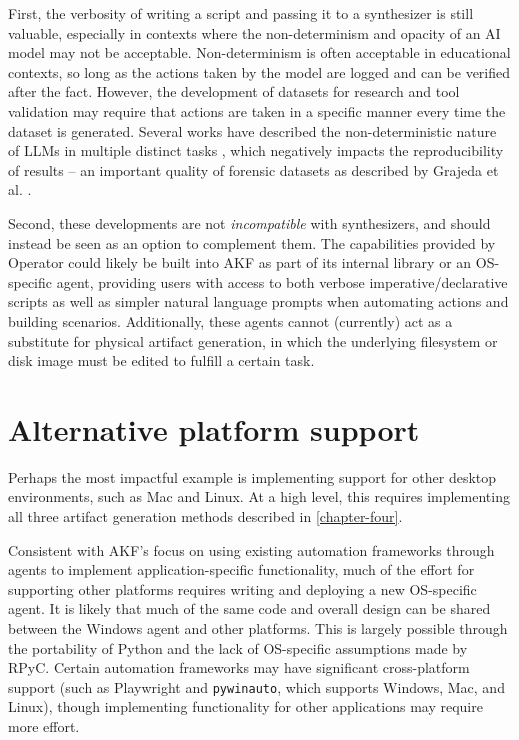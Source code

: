 \documentclass[letterpaper,12pt]{report}
\newcommand{\passthrough}[1]{#1}
\begin{document}
First, the verbosity of writing a script and passing it to a synthesizer
is still valuable, especially in contexts where the non-determinism and
opacity of an AI model may not be acceptable. Non-determinism is often
acceptable in educational contexts, so long as the actions taken by the
model are logged and can be verified after the fact. However, the
development of datasets for research and tool validation may require
that actions are taken in a specific manner every time the dataset is
generated. Several works have described the non-deterministic nature of
LLMs in multiple distinct tasks
\cite{astekinExploratoryStudyHow2024,songGoodBadGreedy2024,ouyangEmpiricalStudyNonDeterminism2025},
which negatively impacts the reproducibility of results -- an important
quality of forensic datasets as described by Grajeda et al.
\cite{grajedaAvailabilityDatasetsDigital2017}.

Second, these developments are not \emph{incompatible} with
synthesizers, and should instead be seen as an option to complement
them. The capabilities provided by Operator could likely be built into
AKF as part of its internal library or an OS-specific agent, providing
users with access to both verbose imperative/declarative scripts as well
as simpler natural language prompts when automating actions and building
scenarios. Additionally, these agents cannot (currently) act as a
substitute for physical artifact generation, in which the underlying
filesystem or disk image must be edited to fulfill a certain task.

\section{Alternative platform
support}\label{alternative-platform-support}

Perhaps the most impactful example is implementing support for other
desktop environments, such as Mac and Linux. At a high level, this
requires implementing all three artifact generation methods described in
\autoref{chapter-four}.

Consistent with AKF's focus on using existing automation frameworks
through agents to implement application-specific functionality, much of
the effort for supporting other platforms requires writing and deploying
a new OS-specific agent. It is likely that much of the same code and
overall design can be shared between the Windows agent and other
platforms. This is largely possible through the portability of Python
and the lack of OS-specific assumptions made by RPyC. Certain automation
frameworks may have significant cross-platform support (such as
Playwright and \passthrough{\lstinline!pywinauto!}, which supports
Windows, Mac, and Linux), though implementing functionality for other
applications may require more effort.
\end{document}

